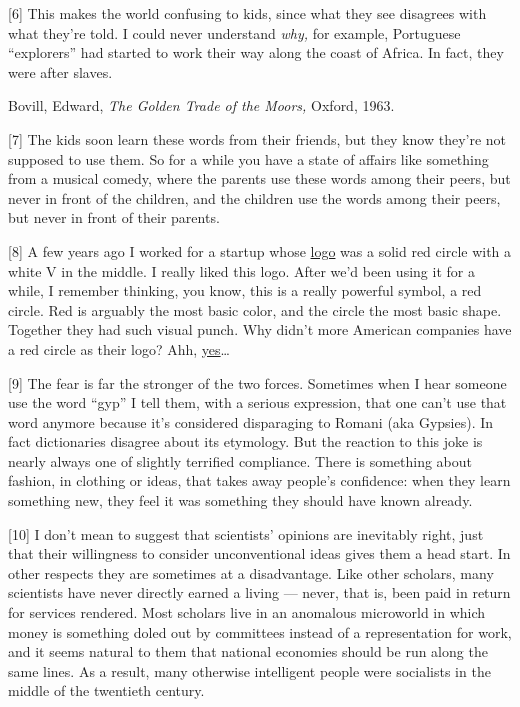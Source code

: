 {[}6{]} This makes the world confusing to kids, since what they see
disagrees with what they're told. I could never understand \emph{why,}
for example, Portuguese ``explorers'' had started to work their way
along the coast of Africa. In fact, they were after slaves.

Bovill, Edward, \emph{The Golden Trade of the Moors,} Oxford, 1963.

{[}7{]} The kids soon learn these words from their friends, but they
know they're not supposed to use them. So for a while you have a state
of affairs like something from a musical comedy, where the parents use
these words among their peers, but never in front of the children, and
the children use the words among their peers, but never in front of
their parents.

{[}8{]} A few years ago I worked for a startup whose
\href{vwfront.html}{logo} was a solid red circle with a white V in the
middle. I really liked this logo. After we'd been using it for a while,
I remember thinking, you know, this is a really powerful symbol, a red
circle. Red is arguably the most basic color, and the circle the most
basic shape. Together they had such visual punch. Why didn't more
American companies have a red circle as their logo? Ahh,
\href{zero.html}{yes}\ldots{}

{[}9{]} The fear is far the stronger of the two forces. Sometimes when I
hear someone use the word ``gyp'' I tell them, with a serious
expression, that one can't use that word anymore because it's considered
disparaging to Romani (aka Gypsies). In fact dictionaries disagree about
its etymology. But the reaction to this joke is nearly always one of
slightly terrified compliance. There is something about fashion, in
clothing or ideas, that takes away people's confidence: when they learn
something new, they feel it was something they should have known
already.

{[}10{]} I don't mean to suggest that scientists' opinions are
inevitably right, just that their willingness to consider unconventional
ideas gives them a head start. In other respects they are sometimes at a
disadvantage. Like other scholars, many scientists have never directly
earned a living --- never, that is, been paid in return for services
rendered. Most scholars live in an anomalous microworld in which money
is something doled out by committees instead of a representation for
work, and it seems natural to them that national economies should be run
along the same lines. As a result, many otherwise intelligent people
were socialists in the middle of the twentieth century.

